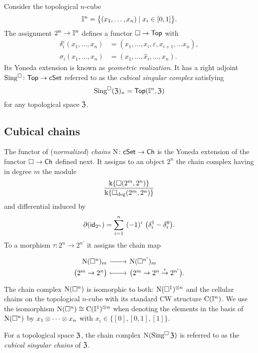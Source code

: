 Consider the topological $n$-cube
\begin{equation*}
\mathbb{I}^{n} = \big\{ (x_1, \dots, x_n) \mid x_i \in [0,1] \big\}.
\end{equation*}
The assignment $2^n \to \mathbb{I}^n$ defines a functor $\square \to \mathsf{Top}$ with
\begin{align*}
\delta^\varepsilon_i(x_1, \dots, x_n) &= (x_1, \dots, x_i, \varepsilon, x_{i+1}, \dots x_n), \\
\sigma_i(x_1,\dots,x_n) &= (x_1, \dots, \widehat{x}_i, \dots, x_n).
\end{align*}
Its Yoneda extension is known as \textit{geometric realization}.
It has a right adjoint $\operatorname{Sing^{\square}} \colon \mathsf{Top} \to \mathsf{cSet}$ referred to as the \textit{cubical singular complex} satisfying
\[
\operatorname{Sing^{\square}}(\mathfrak{Z})_n = \mathsf{Top}(\mathbb{I}^n, \mathfrak{Z})
\]
for any topological space $\mathfrak{Z}$.

\subsection{Cubical chains}

The functor of (\textit{normalized}) \textit{chains} $\operatorname{N} \colon \mathsf{cSet} \to \mathsf{Ch}$ is the Yoneda extension of the functor $\square \to \mathsf{Ch}$ defined next.
It assigns to an object $2^n$ the chain complex having in degree $m$ the module
\[
\frac{\Bbbk\{\square(2^m, 2^n)\}}{\Bbbk\{\square_{\deg}(2^m, 2^n)\}}
\]
and differential induced by
\[
\bd (\id_{2^n}) = \sum_{i=1}^{n} \ (-1)^i \
\big(\delta_i^1 - \delta_i^0 \big).
\]
To a morphism $\tau \colon 2^n \to 2^{n'}$ it assigns the chain map
\[
\begin{tikzcd}[row sep=-3pt, column sep=normal,
/tikz/column 1/.append style={anchor=base east},
/tikz/column 2/.append style={anchor=base west}]
\chains(\cube^n)_m \arrow[r] & \chains(\cube^{n'})_m \\
\big( 2^m \to 2^n \big) \arrow[r, mapsto] & \big( 2^m \to 2^n \stackrel{\tau}{\to} 2^{n'} \big).
\end{tikzcd}
\]
The chain complex $\operatorname{N}(\square^n)$ is isomorphic to both: $\operatorname{N}(\square^1)^{\otimes n}$ and the cellular chains on the topological $n$-cube with its standard CW structure $\operatorname{C}(\mathbb{I}^n)$.
We use the isomorphism $\operatorname{N}(\square^n) \cong \operatorname{C}(\mathbb{I}^1)^{\otimes n}$ when denoting the elements in the basis of $\operatorname{N}(\square^n)$ by $x_1 \otimes \dotsb \otimes x_n$ with $x_i \in \{[0], [0,1], [1]\}$.

For a topological space $\mathfrak{Z}$, the chain complex $\operatorname{N}(\operatorname{Sing^{\square}} \mathfrak{Z})$ is referred to as the \textit{cubical singular chains} of $\mathfrak{Z}$.

